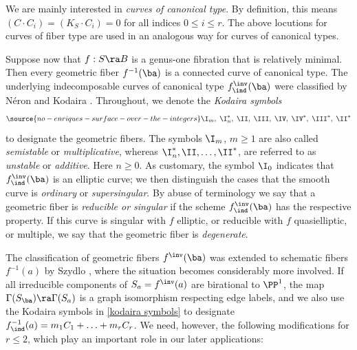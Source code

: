 We are mainly interested in \emph{curves of canonical type}. By definition, this means
$(C\cdot C_i)=(K_S\cdot C_i)=0$ for all indices $0\leq i\leq r$. The above locutions for curves of fiber type
are used in an analogous way for  curves of canonical types.

Suppose now that $f:S\ra B$ is a genus-one fibration that is relatively minimal.
Then every geometric fiber $ f^{-1}(\ba)$ is a connected curve of canonical type.
The underlying indecomposable curves of canonical type $f^\inv_\ind(\ba)$ were classified by N\'eron \cite{Neron-1964} and Kodaira \cite{Kodaira-1963}.
Throughout, we denote the \emph{Kodaira symbols}
\begin{equation}
\label{kodaira symbols}
\source{no-enriques-surface-over-the-integers}
\I_m,\;\I_n^*,\;\II,\;\III,\;\IV,\;\IV^*,\;\III^*,\; \II^*
\end{equation}
to designate the geometric fibers.  The symbols $\I_m$, $m\geq 1$ are also called \emph{semistable} or \emph{multiplicative},
whereas $\I_n^*,\II, \ldots,\II^*$,  are referred to as \emph{unstable} or \emph{additive}. Here $n\geq 0$.
As customary, the symbol $\I_0$ indicates that $f^\inv_\ind(\ba)$ is an elliptic curve; we then distinguish the cases
that the  smooth curve is \emph{ordinary} or \emph{supersingular}.
By abuse of terminology
we say that a geometric fiber is \emph{reducible or singular} if the scheme $f^\inv_\ind(\ba)$ has the respective property.
If this curve is  singular with  $f$  elliptic, or reducible with $f$ quasielliptic, or multiple,
 we say that the geometric fiber is \emph{degenerate}.

The   classification of geometric fibers $f^\inv(\ba)$ was extended to schematic fibers $ f^{-1}(a)$ by Szydlo \cite{Szydlo-2004},
where the situation becomes considerably more involved.
If all irreducible components   of $S_a=f^\inv(a)$
are birational to $\PP^1$, the map $\Gamma(S_\ba)\ra\Gamma(S_a)$ is a graph isomorphism respecting edge labels,
and we also use the Kodaira symbols in \eqref{kodaira symbols} to designate   $f^{-1}_\ind(a)=m_1C_1+\ldots+m_rC_r$.
We need, however, the following modifications for $r\leq 2$, which play an important role in our later applications:

